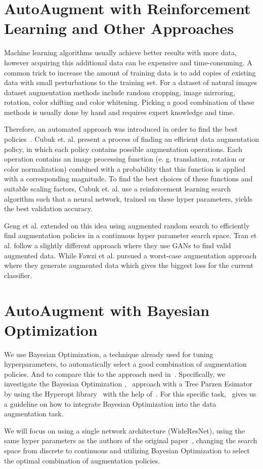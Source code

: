 \documentclass[10pt,twocolumn,letterpaper]{article}
\begin{document}
\section{AutoAugment with Reinforcement Learning and Other Approaches}
Machine learning algorithms usually achieve better results with more data, however acquiring this additional data can be expensive and time-consuming.  A common trick to increase the amount of training data is to add copies of existing data with small perturbations to the training set. For a dataset of natural images dataset augmentation methods include random cropping, image mirroring, rotation, color shifting and color whitening. Picking a good combination of these methods is usually done by hand and requires expert knowledge and time.
\par
Therefore, an automated approach was introduced in order to find the best policies~\cite{Ekin}. Cubuk et. al. present a process of finding an efficient data augmentation policy, in which each policy contains possible augmentation operations. Each operation contains an image processing function (e. g. translation, rotation or color normalization) combined with a probability that this function is applied with a corresponding magnitude. To find the best choices of these functions and suitable scaling factors, Cubuk et. al. use a reinforcement learning search algorithm such that a neural network, trained on these hyper parameters, yields the best validation accuracy. 
\par
Geng et al. \cite{DBLP:journals/corr/abs-1811-04768} extended on this idea using augmented random search to efficiently find augmentation policies in a continuous hyper parameter search space. Tran et al. \cite{DBLP:journals/corr/abs-1710-10564} follow a slightly different approach where they use GANs to find valid augmented data. While Fawzi et al. \cite{Fawzi} pursued a worst-case augmentation approach where they generate augmented data which gives the biggest loss for the current classifier.

\section{AutoAugment with Bayesian Optimization}
We use Bayesian Optimization, a technique already used for tuning hyperparameters, to automatically select a good combination of augmentation policies. And to compare this to the approach used in~\cite{Ekin}. Specifically, we investigate the Bayesian Optimization \cite{2018arXiv180702811F},~\cite{Goodfellow-et-al-2016} approach with a Tree Parzen Esimator~\cite{Kaggle_AMT} by using the Hyperopt library~\cite{HyperOpt} with the help of~\cite{BO_Hyperopt}. For this specific task,~\cite{2017arXiv171010564T} gives us a guideline on how to integrate Bayesian Optimization into the data augmentation task.
\par
We will focus on using a single network architecture (WideResNet), using the same hyper parameters as the authors of the original paper~\cite{Ekin}, changing the search space from discrete to continuous and utilizing Bayesian Optimization to select the optimal combination of augmentation policies. 
\end{document}

